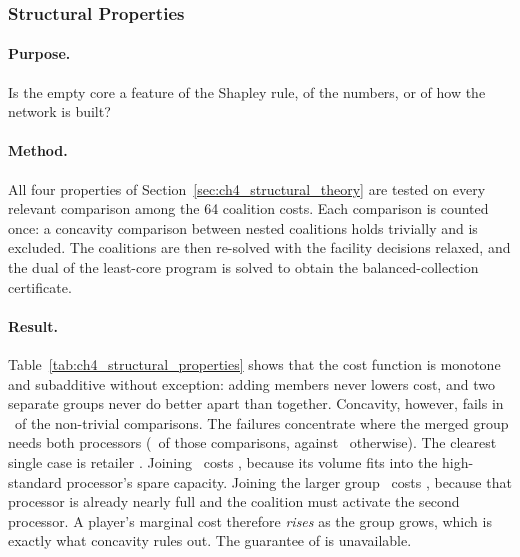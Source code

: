\subsubsection{Structural Properties}

\paragraph{Purpose.} Is the empty core a feature of the Shapley rule, of the numbers, or of how the network is built?

\paragraph{Method.} All four properties of Section~\ref{sec:ch4_structural_theory} are tested on every relevant comparison among the 64 coalition costs. Each comparison is counted once: a concavity comparison between nested coalitions holds trivially and is excluded. The coalitions are then re-solved with the facility decisions relaxed, and the dual of the least-core program is solved to obtain the balanced-collection certificate.

\paragraph{Result.} Table~\ref{tab:ch4_structural_properties} shows that the cost function is monotone and subadditive without exception: adding members never lowers cost, and two separate groups never do better apart than together. Concavity, however, fails in \ChFourConcavePercent\ of the non-trivial comparisons. The failures concentrate where the merged group needs both processors (\ChFourConcaveTwoProcessorPercent\ of those comparisons, against \ChFourConcaveOneProcessorPercent\ otherwise). The clearest single case is retailer \ChFourWorstMarginalPlayer. Joining \ChFourWorstMarginalSmall\ costs \ChFourWorstMarginalEarly, because its volume fits into the high-standard processor's spare capacity. Joining the larger group \ChFourWorstMarginalLarge\ costs \ChFourWorstMarginalLate, because that processor is already nearly full and the coalition must activate the second processor. A player's marginal cost therefore \emph{rises} as the group grows, which is exactly what concavity rules out. The guarantee of \cite{Shapley1971} is unavailable.

\begin{table}[htbp]
\centering
\caption{Structural Properties of the Case Cost Function}
\label{tab:ch4_structural_properties}
\end{table}

